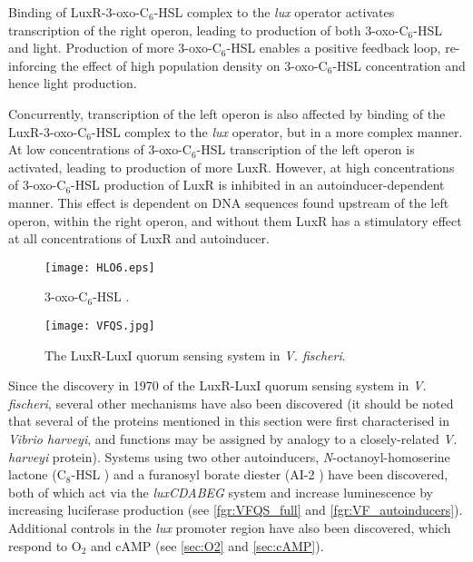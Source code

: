 Binding of LuxR-3-oxo-C$_6$-HSL complex to the \textit{lux} operator activates transcription of the right operon, leading to production of both 3-oxo-C$_6$-HSL  and light. Production of more 3-oxo-C$_6$-HSL  enables a positive feedback loop, re-inforcing the effect of high population density on 3-oxo-C$_6$-HSL  concentration and hence light production.

Concurrently, transcription of the left operon is also affected by binding of the LuxR-3-oxo-C$_6$-HSL complex to the \textit{lux} operator, but in a more complex manner. At low concentrations of 3-oxo-C$_6$-HSL  transcription of the left operon is activated, leading to production of more LuxR.
However, at high concentrations of 3-oxo-C$_6$-HSL  production of LuxR is inhibited in an autoinducer-dependent manner\cite{Dunlap1989}. This effect is dependent on DNA sequences found upstream of the left operon, within the right operon, and without them LuxR has a stimulatory effect at all concentrations of LuxR and autoinducer.




\begin{figure}[H]
	\begin{center}
		\texttt{[image: HLO6.eps]}
		\caption{3-oxo-C$_6$-HSL . \label{fgr:HLO6}}
	\end{center}
\end{figure}

\begin{figure}[H]
	\begin{center}
		\texttt{[image: VFQS.jpg]}
		\caption{The LuxR-LuxI quorum sensing system in \textit{V. fischeri}. \label{fgr:VF_QS}}
	\end{center}
\end{figure}


Since the discovery in 1970 of the LuxR-LuxI quorum sensing system in \textit{V. fischeri}, several other mechanisms have also been discovered (it should be noted that several of the proteins mentioned in this section were first characterised in \textit{Vibrio harveyi}, and functions may be assigned by analogy to a closely-related \textit{V. harveyi} protein\cite{Miyashiro2012}). Systems using two other autoinducers, \textit{N}-octanoyl-homoserine lactone (C$_8$-HSL ) and a furanosyl borate diester (AI-2 ) have been discovered, both of which act via the \textit{luxCDABEG} system and increase luminescence by increasing luciferase production\cite{Miyashiro2012,Verma2013} (see \ref{fgr:VFQS_full} and \ref{fgr:VF_autoinducers}).
Additional controls in the \textit{lux} promoter region have also been discovered, which respond to O$_2$ and cAMP\cite{Miyashiro2012} (see \ref{sec:O2} and \ref{sec:cAMP}). 

